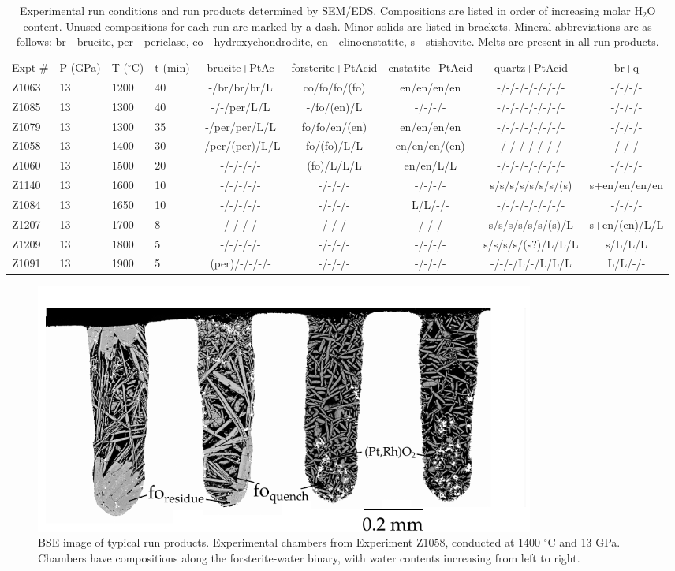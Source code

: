\documentclass[review]{elsarticle}
\begin{document}
\begin{landscape}
\begin{table}[ht!]
\caption{Experimental run conditions and run products determined by SEM/EDS. Compositions are listed in order of increasing molar H$_2$O content. Unused compositions for each run are marked by a dash. Minor solids are listed in brackets. Mineral abbreviations are as follows: br - brucite, per - periclase, co - hydroxychondrodite, en - clinoenstatite, s - stishovite. Melts are present in all run products.}
\label{table:experiments}
\begin{tabular}{llllccccc}
Expt \# & P (GPa) & T ($^{\circ}$C) & t (min) & brucite+PtAc & forsterite+PtAcid & enstatite+PtAcid & quartz+PtAcid & br+q \\
Z1063 & 13 & 1200 & 40 & -/br/br/br/L & co/fo/fo/(fo) & en/en/en/en & -/-/-/-/-/-/-/- & -/-/-/- \\
Z1085 & 13 & 1300 & 40 & -/-/per/L/L & -/fo/(en)/L & -/-/-/- & -/-/-/-/-/-/-/- & -/-/-/- \\
Z1079 & 13 & 1300 & 35 & -/per/per/L/L & fo/fo/en/(en) & en/en/en/en & -/-/-/-/-/-/-/- & -/-/-/- \\
Z1058 & 13 & 1400 & 30 & -/per/(per)/L/L & fo/(fo)/L/L & en/en/en/(en) & -/-/-/-/-/-/-/- & -/-/-/- \\
Z1060 & 13 & 1500 & 20 & -/-/-/-/- & (fo)/L/L/L & en/en/L/L & -/-/-/-/-/-/-/- & -/-/-/- \\
Z1140 & 13 & 1600 & 10 & -/-/-/-/- & -/-/-/- & -/-/-/- & s/s/s/s/s/s/s/(s) & s+en/en/en/en \\
Z1084 & 13 & 1650 & 10 & -/-/-/-/- & -/-/-/- & L/L/-/- & -/-/-/-/-/-/-/- & -/-/-/- \\
Z1207 & 13 & 1700 & 8 & -/-/-/-/- & -/-/-/- & -/-/-/- & s/s/s/s/s/s/(s)/L & s+en/(en)/L/L \\
Z1209 & 13 & 1800 & 5 & -/-/-/-/- & -/-/-/- & -/-/-/- & s/s/s/s/(s?)/L/L/L & s/L/L/L \\
Z1091 & 13 & 1900 & 5 & (per)/-/-/-/- & -/-/-/- & -/-/-/- & -/-/-/L/-/L/L/L & L/L/-/-
\end{tabular}
\end{table}
\end{landscape}


\begin{figure}[ht!]
  \centering
      \includegraphics[width=0.8\textwidth]{figures/Z1058_1400C_13GPa_fo}
  \caption{BSE image of typical run products. Experimental chambers from Experiment Z1058, conducted at 1400 $^{\circ}$C and 13 GPa. Chambers have compositions along the forsterite-water binary, with water contents increasing from left to right.}
  \label{fig:sem}
\end{figure}
\end{document}

